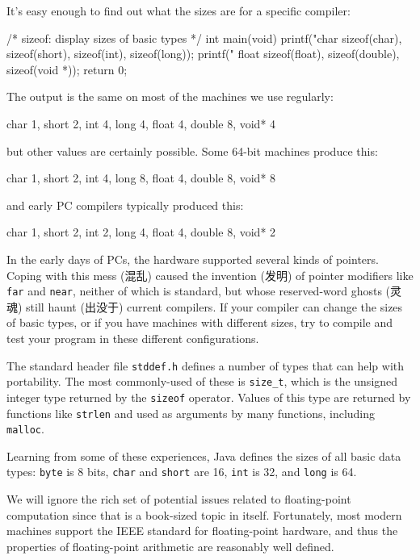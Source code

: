 It's easy enough to find out what the sizes are for a specific compiler:
\begin{wellcode}
    /* sizeof: display sizes of basic types */
    int main(void)
    {
        printf("char %
                sizeof(char), sizeof(short),
                sizeof(int), sizeof(long));
        printf(" float %
                sizeof(float), sizeof(double), sizeof(void *));
        return 0;
    }
\end{wellcode}
The output is the same on most of the machines we use regularly:
\begin{wellcode}
    char 1, short 2, int 4, long 4, float 4, double 8, void* 4
\end{wellcode}
but other values are certainly possible. Some 64-bit machines produce this:
\begin{wellcode}
    char 1, short 2, int 4, long 8, float 4, double 8, void* 8
\end{wellcode}
and early PC compilers typically produced this:
\begin{wellcode}
    char 1, short 2, int 2, long 4, float 4, double 8, void* 2
\end{wellcode}
In the early days of PCs, the hardware supported several kinds of pointers.
Coping with this mess (混乱) caused the invention (发明) of pointer
modifiers like \verb'far' and \verb'near', neither of which is standard,
but whose reserved-word ghosts (灵魂) still haunt (出没于) current
compilers. If your compiler can change the sizes of basic types, or if you
have machines with different sizes, try to compile and test your program in
these different configurations.

The standard header file \verb'stddef.h' defines a number of types that can
help with portability. The most commonly-used of these is \verb'size_t',
which is the unsigned integer type returned by the \verb'sizeof' operator.
Values of this type are returned by functions like \verb'strlen' and used
as arguments by many functions, including \verb'malloc'.

Learning from some of these experiences, Java defines the sizes of all
basic data types: \verb'byte' is 8 bits, \verb'char' and \verb'short' are
16, \verb'int' is 32, and \verb'long' is 64.

We will ignore the rich set of potential issues related to floating-point
computation since that is a book-sized topic in itself. Fortunately, most
modern machines support the IEEE standard for floating-point hardware, and
thus the properties of floating-point arithmetic are reasonably well
defined.

